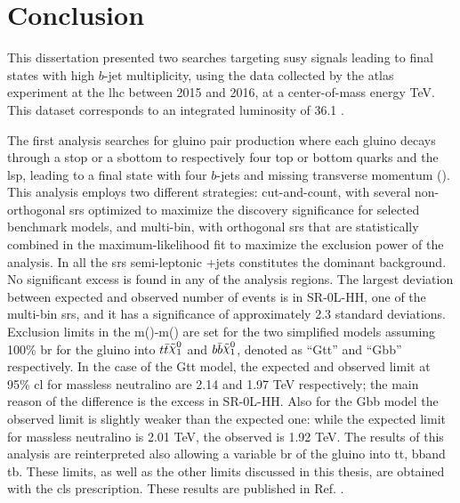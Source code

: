 \chapter{Conclusion}

This dissertation presented two searches targeting \gls{susy} signals leading to final states with 
high $b$-jet multiplicity, using the data collected by the \gls{atlas} experiment at the \gls{lhc} 
between 2015 and 2016, at a center-of-mass energy  \cmtre TeV. 
This dataset corresponds to an integrated luminosity of 36.1 \ifb.

The first analysis searches for gluino pair production where each gluino decays through a stop or a sbottom 
to respectively four top or bottom quarks and the \gls{lsp}, leading to a final state with four $b$-jets and 
missing transverse momentum (\met). 
This analysis employs two different strategies: cut-and-count, with several non-orthogonal \glspl{sr} optimized to 
maximize the discovery significance for selected benchmark models, and multi-bin, with orthogonal \glspl{sr} 
that are statistically combined in the maximum-likelihood fit 
to maximize the exclusion power of the analysis. 
In all the \glspl{sr} semi-leptonic \ttbar+jets constitutes the dominant background.
No significant excess is found in any of the analysis regions. 
The largest deviation between expected and observed number of events 
is in SR-0L-HH, one of the multi-bin \glspl{sr}, and it has a significance of approximately 
2.3 standard deviations. 
Exclusion limits in the m(\gluino)-m(\ninoone) are set for the two simplified models assuming 
100\% \gls{br} for the gluino into $t\bar{t}\ninoone$ and $b\bar{b}\ninoone$, denoted as ``Gtt'' and ``Gbb'' respectively.
In the case of the Gtt model, the expected and observed limit at 95\% \gls{cl} for massless neutralino 
are 2.14 and 1.97 TeV respectively; the main reason of the difference is the excess in SR-0L-HH.
Also for the Gbb model the observed limit is slightly weaker than the expected one: 
while the expected limit for massless neutralino is 2.01 TeV, the observed is 1.92 TeV.
The results of this analysis are reinterpreted also allowing a variable \gls{br} of the gluino 
into tt\ninoone, bb\ninoone and tb\chinoonepm. 
These limits, as well as the other limits discussed in this thesis, are obtained with the \gls{cls} 
prescription. These results are published in Ref. \cite{Aaboud:2017hrg}.


